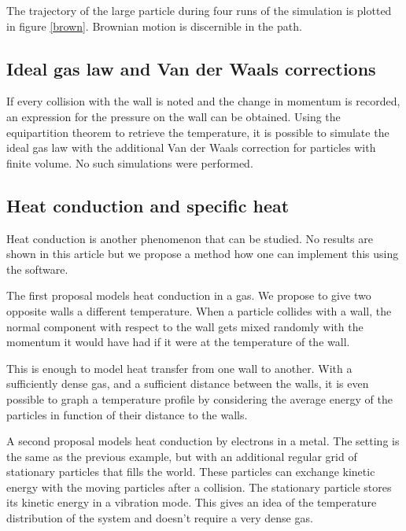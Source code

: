 The trajectory of the large particle during four runs of the simulation is 
plotted in figure \ref{brown}. Brownian motion is discernible in the path.




\subsection{Ideal gas law and Van der Waals corrections}

If every collision with the wall is noted and the change in momentum is 
recorded, an expression for the pressure on the wall can be obtained. Using 
the equipartition theorem to retrieve the temperature, it is possible to 
simulate the ideal gas law with the additional Van der Waals correction for 
particles with finite volume. No such simulations were performed.


\subsection{Heat conduction and specific heat}

Heat conduction is another phenomenon that can be studied. No results are shown 
in this article but we propose a method how one can implement this using the 
software.

The first proposal models heat conduction in a gas. We propose to give two 
opposite walls a different temperature. When a particle collides with a 
wall, the normal component with respect to the wall gets mixed randomly with 
the momentum it would have had if it were at the temperature of the wall.  


This is enough to model heat transfer from one wall to another. With a 
sufficiently dense gas, and a sufficient distance between the walls, it is 
even possible to graph a temperature profile by considering the average 
energy of the particles in function of their distance to the walls.

A second proposal models heat conduction by electrons in a metal. The 
setting is the same as the previous example, but with an additional regular 
grid of stationary particles that fills the world. These particles can 
exchange kinetic energy with the moving particles after a collision. The 
stationary particle stores its kinetic energy in a vibration mode. This 
gives an idea of the temperature distribution of the system and doesn't 
require a very dense gas.

